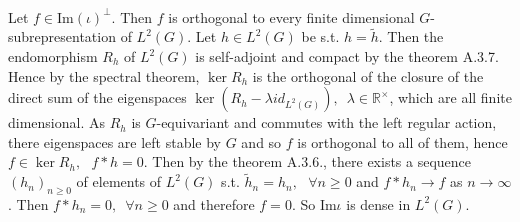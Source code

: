 \documentclass[12pt,letterpaper]{report}
\begin{document}
\begin{itemize}
\\Let $f\in \text{Im}(\iota)^{\perp}$. Then $f$ is orthogonal to every finite dimensional $G$-subrepresentation of $L^{2}(G)$. Let $h\in L^{2}(G)$ be s.t. $h=\tilde{h}$. Then the endomorphism $R_{h}$ of $L^{2}(G)$ is self-adjoint and compact by the theorem A.3.7. Hence by the spectral theorem, $\ker R_{h}$ is the orthogonal of the closure of the direct sum of the eigenspaces $\ker(R_{h}-\lambda id_{L^{2}(G)}),\,\,\,\lambda\in\mathbb{R}^{\times}$, which are all finite dimensional. As $R_{h}$ is $G$-equivariant and commutes with the left regular action, there eigenspaces are left stable by $G$ and so $f$ is orthogonal to all of them, hence $f\in\ker R_{h},\,\,\,\,f*h=0$. Then by the theorem A.3.6., there exists a sequence $(h_{n})_{n\geq0}$ of elements of $L^{2}(G)$ s.t. $\tilde{h}_{n}=h_{n},\,\,\,\,\forall n\geq0$ and $f*h_{n}\rightarrow f$ as $n\rightarrow\infty$. Then $f*h_{n}=0,\,\,\,\forall n\geq0$ and therefore $f=0$. So Im$\iota$ is dense in $L^{2}(G)$.  

\end{itemize}
\end{document}
